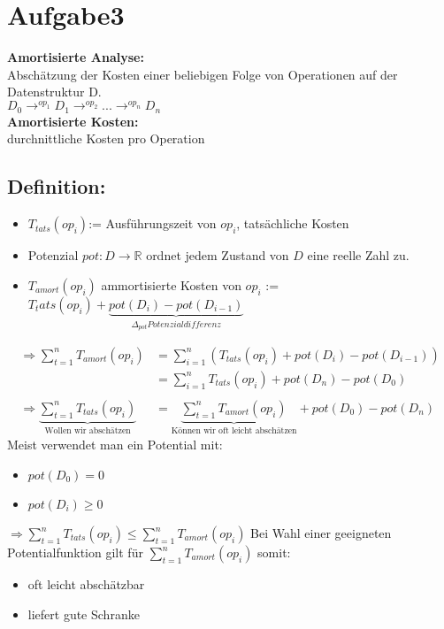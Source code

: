\documentclass[10pt,a4paper]{article}
\begin{document}
\section*{Aufgabe3}

\textbf{Amortisierte Analyse:}\\ 
Abschätzung der Kosten einer beliebigen Folge von Operationen auf der Datenstruktur D.\\
$D_0 \rightarrow^{op_1} D_1 \rightarrow^{op_2} ... \rightarrow^{op_n} D_n$\\ 
 \newline 
\textbf{Amortisierte Kosten:}\\ 
durchnittliche Kosten pro Operation

\subsection*{Definition:}
\begin{itemize}
    \item $T_{tats}(op_i)$:= Ausführungszeit von $op_i$, tatsächliche Kosten
    \item Potenzial $pot: D \rightarrow \mathbb{R}$ ordnet jedem Zustand von $D$ eine reelle Zahl zu.
    \item $T_{amort}(op_i)$ ammortisierte Kosten von $op_i$ := $T_tats(op_i)+\underbrace{pot(D_i)-pot(D_{i-1})}_{\Delta_{pot} Potenzialdifferenz}$
\end{itemize}

\begin{equation*}
\begin{split}
\Rightarrow \sum \limits_{t=1}^n T_{amort}(op_i) &= \sum \limits_{i=1}^n ( T_{tats}(op_i) + pot(D_i) - pot(D_{i-1}) )  \\
                                                &= \sum \limits_{i=1}^n  T_{tats}(op_i) + pot(D_n) - pot(D_0)\\ 
                                                & \\
\Rightarrow \underbrace{\sum \limits_{t=1}^n T_{tats}(op_i)}_{\text{Wollen wir abschätzen}}  &=\underbrace{ \sum \limits_{t=1}^n T_{amort}(op_i)}_{\text{Können wir oft leicht abschätzen}}  + pot(D_0) - pot(D_n)                           
\end{split}
\end{equation*}
 \newline
Meist verwendet man ein Potential mit:
\begin{itemize}
    \item $pot(D_0) = 0$
    \item $pot(D_i) \geq 0$
\end{itemize}
$\Rightarrow \sum \limits_{t=1}^n T_{tats}(op_i) \leq \sum \limits_{t=1}^n T_{amort}(op_i)$ 
 \newline
Bei Wahl einer geeigneten Potentialfunktion gilt für $\sum \limits_{t=1}^n T_{amort}(op_i)$ somit:
\begin{itemize}
    \item oft leicht abschätzbar
    \item liefert gute Schranke
\end{itemize}
\end{document}
